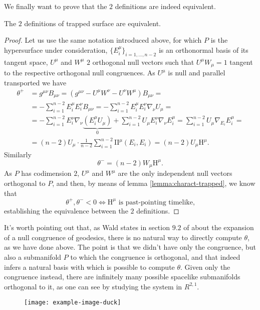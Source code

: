 We finally want to prove that the \(2\) definitions are indeed equivalent.
\begin{lemma}
	\label{lemma:equiv-trapped}
	The \(2\) definitions of trapped surface are equivalent.
\end{lemma}
\begin{proof}
	Let us use the same notation introduced above, for which \(P\) is the hypersurface under consideration, \(\{E_i^{\mu}\}_{i = 1, \ldots, n - 2}\) is an orthonormal basis of its tangent space, \(U^{\mu}\) and \(W^{\mu}\) \(2\) orthogonal null vectors such that \(U^{\mu}W_{\mu} = 1\) tangent to the respective orthogonal null congruences. As \(U^{\mu}\) is null and parallel transported we have
	\begin{align*}
		\theta^+ &= g^{\mu\nu}B_{\mu\nu} = \left(g^{\mu\nu} - U^{\mu}W^{\nu} - U^{\nu}W^{\mu}\right)B_{\mu\nu} =\\
		&= - \sum_{i=1}^{n - 2}E_i^{\mu}E_i^{\nu}B_{\mu\nu} = - \sum_{i=1}^{n - 2}E_i^{\mu}E_i^{\nu}\nabla_{\nu}U_{\mu} = \\
		& = -  \sum_{i=1}^{n - 2}E_i^{\nu}\nabla_{\nu}\underbrace{\left(E_i^{\mu}U_{\mu}\right)}_{0} +  \sum_{i=1}^{n - 2}U_{\mu}E_i^{\nu}\nabla_{\nu}E_i^{\mu} = \sum_{i=1}^{n - 2}U_{\mu}\nabla_{E_i}E_i^{\mu} = \\
		& = (n - 2) U_{\mu} \cdot \frac{1}{n - 2}\sum_{i=1}^{n - 2}\mathrm{I\!I}^{\mu} \left(E_i, E_i\right) = (n - 2) U_{\mu}\mathrm{H}^{\mu}.
	\end{align*}
	Similarly
	\[
	\theta^- = (n - 2) W_{\mu}\mathrm{H}^{\mu}.
	\]
	As \(P\) has codimension \(2\), \(U^{\mu}\) and \(W^{\mu}\) are the only independent null vectors orthogonal to \(P\), and then, by means of lemma \ref{lemma:charact-trapped}, we know that 
	\[
	\theta^+ , \theta^- < 0 \iff \mathrm{H}^{\mu} \text{ is past-pointing timelike,}
	\]
	establishing the equivalence between the \(2\) definitions.
\end{proof}

\begin{remark}
	It's worth pointing out that, as Wald states in section \(9.2\) of \cite{wald2010general} about the expansion of a null congruence of geodesics, there is no natural way to directly compute \(\theta\), as we have done above. The point is that we didn't have only the congruence, but also a submanifold \(P\) to which the congruence is orthogonal, and that indeed infers a natural basis with which is possible to compute \(\theta\). Given only the congruence instead, there are infinitely many possible spacelike submanifolds orthogonal to it, as one can see by studying the system in \(R^{2,1}\).
	\begin{figure}[!h]
		\centering
		\texttt{[image: example-image-duck]}
	\end{figure}
\end{remark}


